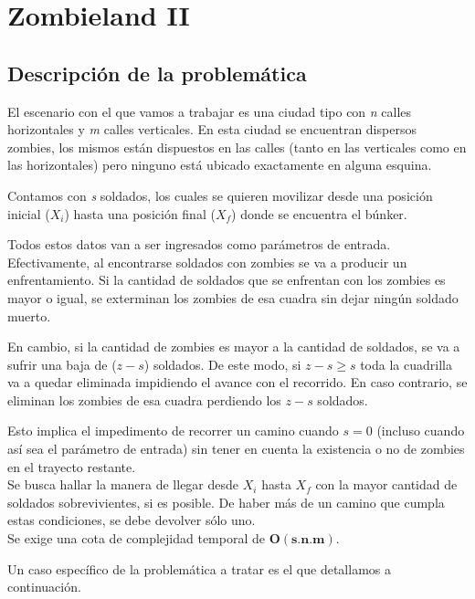 \section{Zombieland II}
\subsection{Descripci\'on de la problem\'atica}


El escenario con el que vamos a trabajar es una ciudad tipo con \emph{n} calles horizontales y \emph{m} calles verticales. En esta ciudad se encuentran dispersos zombies, los mismos est\'an dispuestos en las calles (tanto en las verticales como en las horizontales) pero ninguno est\'a ubicado exactamente en alguna esquina. 

Contamos con \emph{s} soldados, los cuales se quieren movilizar desde una posici\'on inicial ($X_i$) hasta una posici\'on final ($X_f$) donde se encuentra el b\'unker.

Todos estos datos van a ser ingresados como par\'ametros de entrada.\\

Efectivamente, al encontrarse soldados con zombies se va a producir un enfrentamiento. Si la cantidad de soldados que se enfrentan con los zombies es mayor o igual, se exterminan los zombies de esa cuadra sin dejar ning\'un soldado muerto. 

En cambio, si la cantidad de zombies es mayor a la cantidad de soldados, se va a sufrir una baja de ($z-s$) soldados. De este modo, si $z-s\geq s$ toda la cuadrilla va a quedar eliminada impidiendo el avance con el recorrido. En caso contrario, se eliminan los zombies de esa cuadra perdiendo los $z-s$ soldados.

Esto implica el impedimento de recorrer un camino cuando $s=0$ (incluso cuando as\'i sea el par\'ametro de entrada) sin tener en cuenta la existencia o no de zombies en el trayecto restante.\\

Se busca hallar la manera de llegar desde $X_i$ hasta $X_f$ con la mayor cantidad de soldados sobrevivientes, si es posible. De haber m\'as de un camino que cumpla estas condiciones, se debe devolver s\'olo uno.\\

Se exige una cota de complejidad temporal de $\mathbf{O(s.n.m)}$.\\

\bigskip

Un caso espec\'ifico de la problem\'atica a tratar es el que detallamos a continuaci\'on.\\

